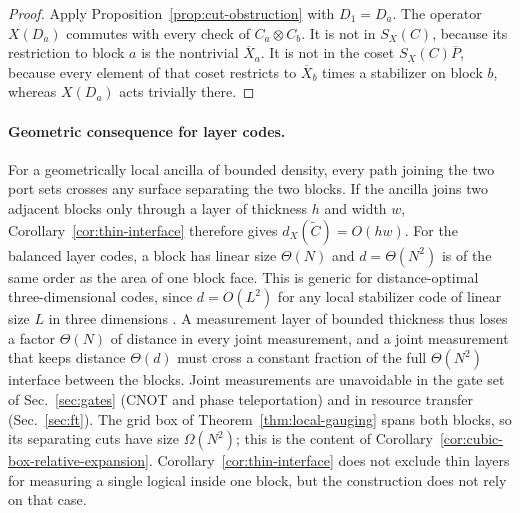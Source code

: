 \documentclass[aps,prx,reprint,superscriptaddress,nofootinbib,floatfix,longbibliography]{revtex4-2}
\theoremstyle{definition}
\begin{document}
\begin{proof}
Apply Proposition~\ref{prop:cut-obstruction} with $D_1=D_a$.  The operator
$X(D_a)$ commutes with every check of $C_a\otimes C_b$.  It is not in
$S_X(C)$, because its restriction to block $a$ is the nontrivial
$\overline X_a$.  It is not in the coset $S_X(C)\overline P$, because every
element of that coset restricts to $\overline X_b$ times a stabilizer on block
$b$, whereas $X(D_a)$ acts trivially there.
\end{proof}

\paragraph{Geometric consequence for layer codes.}
For a geometrically local ancilla of bounded density, every path joining the
two port sets crosses any surface separating the two blocks.  If the ancilla
joins two adjacent blocks only through a layer of thickness $h$ and width $w$,
Corollary~\ref{cor:thin-interface} therefore gives $d_X(\widetilde C)=O(hw)$.
For the balanced layer codes, a block has linear size $\Theta(N)$ and
$d=\Theta(N^2)$ is of the same order as the area of one block face.  This is
generic for distance-optimal three-dimensional codes, since
$d=O(L^2)$ for any local stabilizer code of linear size $L$ in three
dimensions \cite{BravyiTerhal2009}.  A measurement layer of bounded thickness thus loses
a factor $\Theta(N)$ of distance in every joint measurement, and a joint
measurement that keeps distance $\Theta(d)$ must cross a constant fraction of
the full $\Theta(N^2)$ interface between the blocks.  Joint measurements are
unavoidable in the gate set of Sec.~\ref{sec:gates} (CNOT and phase
teleportation) and in resource transfer (Sec.~\ref{sec:ft}).  The grid box of
Theorem~\ref{thm:local-gauging} spans both blocks, so its separating cuts have
size $\Omega(N^2)$; this is the content of
Corollary~\ref{cor:cubic-box-relative-expansion}.  Corollary~\ref{cor:thin-interface} does not
exclude thin layers for measuring a single logical inside one block, but the
construction does not rely on that case.
\end{document}
